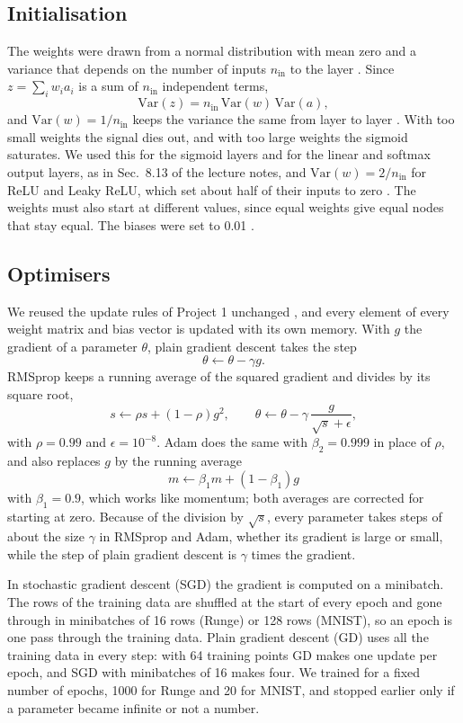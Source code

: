 \subsection*{Initialisation}

The weights were drawn from a normal distribution with mean zero and a variance that depends on the number of inputs $n_{\mathrm{in}}$ to the layer \cite[Sec.~8.10]{HjorthJensen2026}. Since $z = \sum_i w_i a_i$ is a sum of $n_{\mathrm{in}}$ independent terms,
$$
\mathrm{Var}(z) = n_{\mathrm{in}}\,\mathrm{Var}(w)\,\mathrm{Var}(a),
$$
and $\mathrm{Var}(w) = 1/n_{\mathrm{in}}$ keeps the variance the same from layer to layer \cite{Glorot2010}. With too small weights the signal dies out, and with too large weights the sigmoid saturates. We used this for the sigmoid layers and for the linear and softmax output layers, as in Sec.~8.13 of the lecture notes, and $\mathrm{Var}(w) = 2/n_{\mathrm{in}}$ for ReLU and Leaky ReLU, which set about half of their inputs to zero \cite{He2015}. The weights must also start at different values, since equal weights give equal nodes that stay equal. The biases were set to 0.01 \cite[Sec.~8.10]{HjorthJensen2026}.

\subsection*{Optimisers}

We reused the update rules of Project 1 unchanged \cite[Secs.~4.7, 4.10, 4.11]{HjorthJensen2026}, and every element of every weight matrix and bias vector is updated with its own memory. With $g$ the gradient of a parameter $\theta$, plain gradient descent takes the step
$$
\theta \leftarrow \theta - \gamma g .
$$
RMSprop keeps a running average of the squared gradient and divides by its square root,
$$
s \leftarrow \rho s + (1 - \rho)g^2, \qquad \theta \leftarrow \theta - \gamma\,\frac{g}{\sqrt{s} + \epsilon},
$$
with $\rho = 0.99$ and $\epsilon = 10^{-8}$. Adam \cite{Kingma2015} does the same with $\beta_2 = 0.999$ in place of $\rho$, and also replaces $g$ by the running average
$$
m \leftarrow \beta_1 m + (1 - \beta_1)g
$$
with $\beta_1 = 0.9$, which works like momentum; both averages are corrected for starting at zero. Because of the division by $\sqrt{s}$, every parameter takes steps of about the size $\gamma$ in RMSprop and Adam, whether its gradient is large or small, while the step of plain gradient descent is $\gamma$ times the gradient.

In stochastic gradient descent (SGD) the gradient is computed on a minibatch. The rows of the training data are shuffled at the start of every epoch and gone through in minibatches of 16 rows (Runge) or 128 rows (MNIST), so an epoch is one pass through the training data. Plain gradient descent (GD) uses all the training data in every step: with 64 training points GD makes one update per epoch, and SGD with minibatches of 16 makes four. We trained for a fixed number of epochs, 1000 for Runge and 20 for MNIST, and stopped earlier only if a parameter became infinite or not a number.

